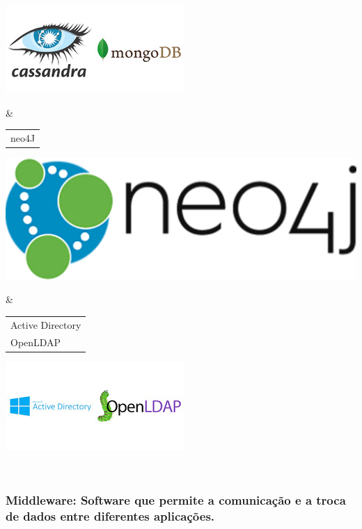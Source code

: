 \documentclass[
]{book}
\begin{document}
\begin{longtable}[]
\begin{minipage}[t]{\linewidth}
\includegraphics{images/clipboard-1618144074.png}
\end{minipage} & \begin{minipage}[t]{\linewidth}\centering
\begin{longtable}[]{@{}l@{}}
\toprule\noalign{}
\endhead
\bottomrule\noalign{}
\endlastfoot
neo4J \\
\end{longtable}

\includegraphics{images/clipboard-2057319963.png}
\end{minipage} & \begin{minipage}[t]{\linewidth}\centering
\begin{longtable}[]{@{}l@{}}
\toprule\noalign{}
\endhead
\bottomrule\noalign{}
\endlastfoot
Active Directory \\
OpenLDAP \\
\end{longtable}

\includegraphics{images/clipboard-1964387230.png}
\end{minipage} \\
\end{longtable}

\subsubsection{Middleware: Software que permite a comunicação e a troca de dados entre diferentes aplicações.}\label{middleware-software-que-permite-a-comunicauxe7uxe3o-e-a-troca-de-dados-entre-diferentes-aplicauxe7uxf5es.}
\end{document}
